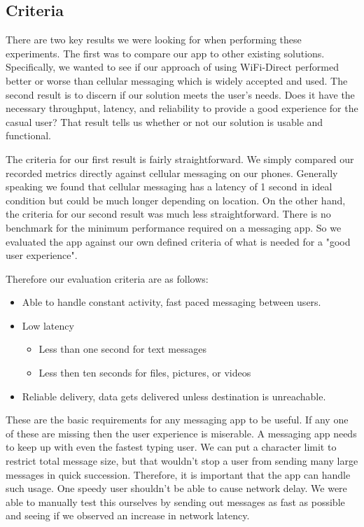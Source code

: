 \documentclass[10pt]{article}
\begin{document}
\subsection{Criteria}

There are two key results we were looking for when performing these experiments. The first was to compare our app to other existing solutions. Specifically, we wanted to see if our approach of using WiFi-Direct performed better or worse than cellular messaging which is widely accepted and used. The second result is to discern if our solution meets the user's needs. Does it have the necessary throughput, latency, and reliability to provide a good experience for the casual user? That result tells us whether or not our solution is usable and functional.

The criteria for our first result is fairly straightforward. We simply compared our recorded metrics directly against cellular messaging on our phones. Generally speaking we found that cellular messaging has a latency of 1 second in ideal condition but could be much longer depending on location. On the other hand, the criteria for our second result was much less straightforward. There is no benchmark for the minimum performance required on a messaging app. So we evaluated the app against our own defined criteria of what is needed for a "good user experience".

Therefore our evaluation criteria are as follows:
\begin{itemize}
    \item Able to handle constant activity, fast paced messaging between users.
    \item Low latency
          \begin{itemize}
              \item Less than one second for text messages
              \item Less then ten seconds for files, pictures, or videos
          \end{itemize}
    \item Reliable delivery, data gets delivered unless destination is unreachable.
\end{itemize}

These are the basic requirements for any messaging app to be useful. If any one of these are missing then the user experience is miserable.
A messaging app needs to keep up with even the fastest typing user. We can put a character limit to restrict total message size, but that wouldn't stop a user from sending many large messages in quick succession. Therefore, it is important that the app can handle such usage. One speedy user shouldn't be able to cause network delay. We were able to manually test this ourselves by sending out messages as fast as possible and seeing if we observed an increase in network latency.
\end{document}
